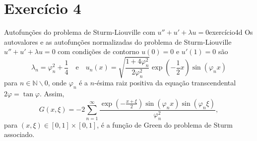 \section*{Exercício 4}
\begin{proposition}{Autofunções do problema de Sturm-Liouville com \(u'' + u' + \lambda u = 0\)}{exercício4d}
    Os autovalores e as autofunções normalizadas do problema de Sturm-Liouville \(u'' + u' + \lambda u = 0\) com condições de contorno \(u(0) = 0\) e \(u'(1) = 0\) são
    \begin{equation*}
        \lambda_n =\varphi_n^2+ \frac14
        \quad\text{e}\quad
        u_n(x) = \sqrt{\frac{1 + 4\varphi_n^2}{2\varphi_n^2}}\exp\left(-\frac{1}{2}x\right)\sin\left(\varphi_n x\right)
    \end{equation*}
    para \(n \in \mathbb{N}\smallsetminus{0}\), onde \(\varphi_n\) é a \(n\)-ésima raiz positiva da equação transcendental \(2\varphi = \tan\varphi\). Assim,
    \begin{equation*}
        G(x,\xi) =- 2\sum_{n = 1}^\infty \frac{\exp\left(-\frac{x + \xi}{2}\right)\sin\left(\varphi_n x\right)\sin\left(\varphi_n \xi\right)}{\varphi_n^2},
    \end{equation*}
    para \((x,\xi) \in [0,1]\times[0,1]\), é a função de Green do problema de Sturm associado.
\end{proposition}
